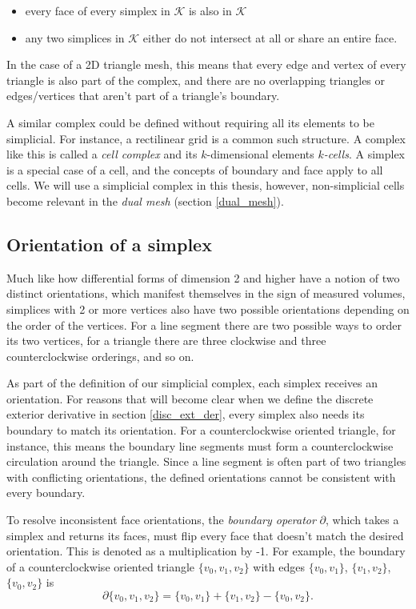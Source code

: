 \documentclass[utf8,english]{gradu3}
\begin{document}
\begin{itemize}
  \item every face of every simplex in $\mathcal{K}$ is also in $\mathcal{K}$
  \item any two simplices in $\mathcal{K}$ either do not intersect at all
    or share an entire face.
\end{itemize}

In the case of a 2D triangle mesh, this means
that every edge and vertex of every triangle is also part of the complex,
and there are no overlapping triangles
or edges/vertices that aren't part of a triangle's boundary.

A similar complex could be defined without requiring
all its elements to be simplicial.
For instance, a rectilinear grid is a common such structure.
A complex like this is called a \textit{cell complex}
and its $k$-dimensional elements \textit{$k$-cells}.
A simplex is a special case of a cell,
and the concepts of boundary and face apply to all cells.
We will use a simplicial complex in this thesis,
however, non-simplicial cells become relevant in the \textit{dual mesh}
(section \ref{dual_mesh}).


\subsection{Orientation of a simplex}

Much like how differential forms of dimension 2 and higher
have a notion of two distinct orientations,
which manifest themselves in the sign of measured volumes,
simplices with 2 or more vertices also have two possible orientations
depending on the order of the vertices.
For a line segment there are two possible ways to order its two vertices,
for a triangle there are three clockwise and three counterclockwise orderings,
and so on.

As part of the definition of our simplicial complex,
each simplex receives an orientation.
For reasons that will become clear when
we define the discrete exterior derivative in section \ref{disc_ext_der},
every simplex also needs its boundary to match its orientation.
For a counterclockwise oriented triangle, for instance,
this means the boundary line segments must form
a counterclockwise circulation around the triangle.
Since a line segment is often part of two triangles with conflicting orientations,
the defined orientations cannot be consistent with every boundary.

To resolve inconsistent face orientations,
the \textit{boundary operator} $\partial$,
which takes a simplex and returns its faces,
must flip every face that doesn't match the desired orientation.
This is denoted as a multiplication by -1.
For example, the boundary of a counterclockwise oriented triangle $\{v_0, v_1, v_2\}$
with edges $\{v_0, v_1\}$, $\{v_1, v_2\}$, $\{v_0, v_2\}$ is
\[
  \partial \{v_0, v_1, v_2\} = \{v_0, v_1\} + \{v_1, v_2\} - \{v_0, v_2\}.
\]
\end{document}
